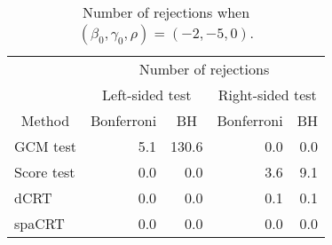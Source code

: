 \begin{table}[!h]
\centering
\caption{\label{tab:simulation_rejection_beta_-2_gamma_-5}Number of rejections when $(\beta_0,\gamma_0,\rho) = (-2, -5, 0)$.}
\centering
\begin{tabular}[t]{lrrrr}
\toprule
\multicolumn{1}{c}{ } & \multicolumn{4}{c}{Number of rejections} \\
\cmidrule(l{3pt}r{3pt}){2-5}
\multicolumn{1}{c}{ } & \multicolumn{2}{c}{Left-sided test} & \multicolumn{2}{c}{Right-sided test} \\
\cmidrule(l{3pt}r{3pt}){2-3} \cmidrule(l{3pt}r{3pt}){4-5}
\multicolumn{1}{c}{Method} & \multicolumn{1}{c}{Bonferroni} & \multicolumn{1}{c}{BH} & \multicolumn{1}{c}{Bonferroni} & \multicolumn{1}{c}{BH} \\
\cmidrule(l{3pt}r{3pt}){1-1} \cmidrule(l{3pt}r{3pt}){2-2} \cmidrule(l{3pt}r{3pt}){3-3} \cmidrule(l{3pt}r{3pt}){4-4} \cmidrule(l{3pt}r{3pt}){5-5}
GCM test & 5.1 & 130.6 & 0.0 & 0.0\\
Score test & 0.0 & 0.0 & 3.6 & 9.1\\
dCRT & 0.0 & 0.0 & 0.1 & 0.1\\
spaCRT & 0.0 & 0.0 & 0.0 & 0.0\\
\bottomrule
\end{tabular}
\end{table}

